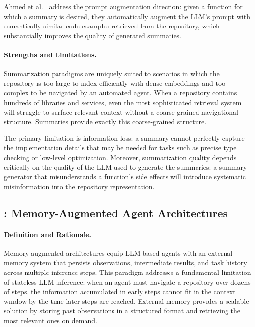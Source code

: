 Ahmed et al.~\cite{ahmed2024automatic} address the prompt augmentation direction: given a
function for which a summary is desired, they automatically augment the LLM's prompt with
semantically similar code examples retrieved from the repository, which substantially improves
the quality of generated summaries.

\paragraph{Strengths and Limitations.}
Summarization paradigms are uniquely suited to scenarios in which the repository is too large
to index efficiently with dense embeddings and too complex to be navigated by an automated
agent. When a repository contains hundreds of libraries and services, even the most
sophisticated retrieval system will struggle to surface relevant context without a coarse-grained
navigational structure. Summaries provide exactly this coarse-grained structure.

The primary limitation is information loss: a summary cannot perfectly capture the implementation
details that may be needed for tasks such as precise type checking or low-level optimization.
Moreover, summarization quality depends critically on the quality of the LLM used to generate
the summaries: a summary generator that misunderstands a function's side effects will introduce
systematic misinformation into the repository representation.

\subsection{: Memory-Augmented Agent Architectures}
\label{subsec:par6}

\paragraph{Definition and Rationale.}
Memory-augmented architectures equip LLM-based agents with an external memory system that
persists observations, intermediate results, and task history across multiple inference steps.
This paradigm addresses a fundamental limitation of stateless LLM inference: when an agent
must navigate a repository over dozens of steps, the information accumulated in early steps
cannot fit in the context window by the time later steps are reached. External memory provides
a scalable solution by storing past observations in a structured format and retrieving the most
relevant ones on demand.

